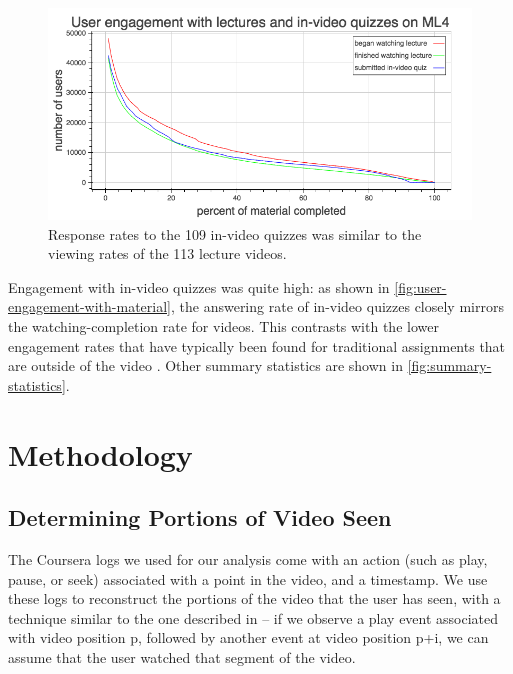 \documentclass{sigchi}
\begin{document}
\begin{figure}
\includegraphics[width=1.0\columnwidth]{user-engagement-with-material}
\caption{Response rates to the 109 in-video quizzes was similar to the viewing rates of the 113 lecture videos.}
\label{fig:user-engagement-with-material}
\end{figure}

Engagement with in-video quizzes was quite high: as shown in \autoref{fig:user-engagement-with-material}, the answering rate of in-video quizzes closely mirrors the watching-completion rate for videos. This contrasts with the lower engagement rates that have typically been found for traditional assignments that are outside of the video \cite{renedisengagement} \cite{ashton}. Other summary statistics are shown in \autoref{fig:summary-statistics}.


\section{Methodology}

\subsection{Determining Portions of Video Seen}

The Coursera logs we used for our analysis come with an action (such as play, pause, or seek) associated with a point in the video, and a timestamp. We use these logs to reconstruct the portions of the video that the user has seen, with a technique similar to the one described in \cite{juho} -- if we observe a play event associated with video position p, followed by another event at video position p+i, we can assume that the user watched that segment of the video.
\end{document}
